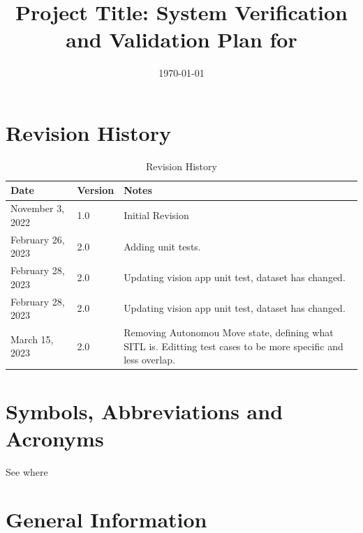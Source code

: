 \documentclass[12pt, titlepage]{article}
\begin{document}
\title{Project Title: System Verification and Validation Plan for \progname{}} 
\author{\authname}
\date{\today}
	
\maketitle


\section{Revision History}

\begin{table}[hp]
\caption{Revision History} \label{TblRevisionHistory}
\begin{tabularx}{\textwidth}{llX}
\toprule
\toprule {\bf Date} & {\bf Version} & {\bf Notes}\\
\midrule
November 3, 2022 & 1.0 & Initial Revision \\
February 26, 2023 & 2.0 & Adding unit tests. \\
February 28, 2023 & 2.0 & Updating vision app unit test, dataset has changed. \\
February 28, 2023 & 2.0 & Updating vision app unit test, dataset has changed. \\
March 15, 2023 & 2.0 & Removing Autonomou Move state, defining what SITL is. Editting test cases to be more specific and less overlap.  \\
\bottomrule
\end{tabularx}
\end{table}

\newpage

\tableofcontents

\listoftables

\listoffigures

\newpage

\section{Symbols, Abbreviations and Acronyms}
  
See where 

\newpage


\section{General Information}
\end{document}
